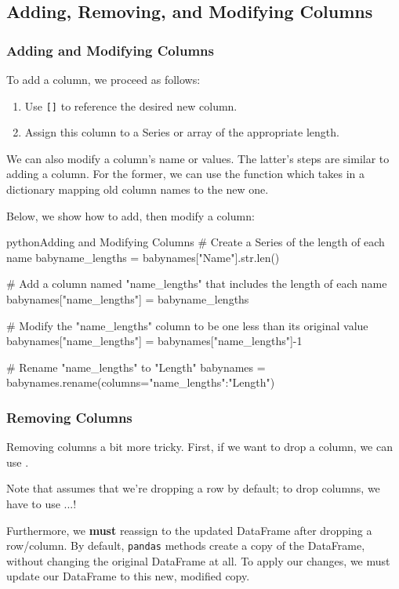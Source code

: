 \documentclass[openany]{book}
\begin{document}
\subsection{Adding, Removing, and Modifying Columns}
\subsubsection{Adding and Modifying Columns}
To add a column, we proceed as follows:
\begin{enumerate}
	\item Use \texttt{[]} to reference the desired new column.
	\item Assign this column to a Series or array of the appropriate length.
\end{enumerate}

We can also modify a column's name or values. The latter's steps are similar to adding a column. For the former, we can use the  function which takes in a dictionary mapping old column names to the new one.

Below, we show how to add, then modify a column:

\begin{code}{python}{Adding and Modifying Columns}
# Create a Series of the length of each name
babyname_lengths = babynames["Name"].str.len()

# Add a column named "name_lengths" that includes the length of each name
babynames["name_lengths"] = babyname_lengths

# Modify the "name_lengths" column to be one less than its original value
babynames["name_lengths"] = babynames["name_lengths"]-1

# Rename "name_lengths" to "Length"
babynames = babynames.rename(columns={"name_lengths":"Length"})
\end{code}

\subsubsection{Removing Columns}
Removing columns a bit more tricky. First, if we want to drop a column, we can use .

\begin{warn}
	Note that  assumes that we're dropping a row by default; to drop columns, we have to use ...!
	
	Furthermore, we \textbf{must} reassign to the updated DataFrame after dropping a row/column. By default, \texttt{pandas} methods create a copy of the DataFrame, without changing the original DataFrame at all. To apply our changes, we must update our DataFrame to this new, modified copy.
\end{warn}
\end{document}
